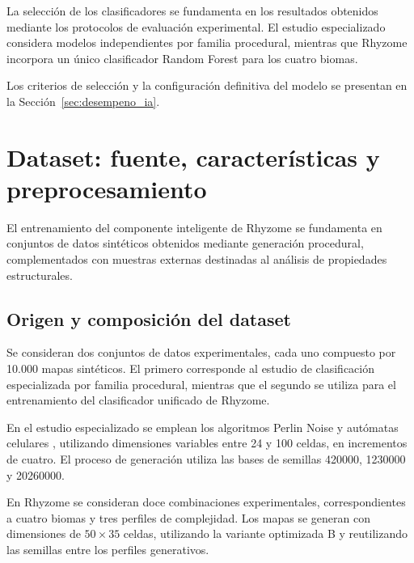 \FloatBarrier

La selección de los clasificadores se fundamenta en los resultados obtenidos mediante los protocolos de evaluación experimental. El estudio especializado considera modelos independientes por familia procedural, mientras que Rhyzome incorpora un único clasificador Random Forest para los cuatro biomas.

Los criterios de selección y la configuración definitiva del modelo se presentan en la Sección~\ref{sec:desempeno_ia}.


\section{Dataset: fuente, características y preprocesamiento}
\label{sec:dataset_ia}

El entrenamiento del componente inteligente de Rhyzome  se fundamenta en conjuntos de datos sintéticos obtenidos mediante generación procedural, complementados con muestras externas destinadas al análisis de propiedades estructurales.


\subsection{Origen y composición del dataset}
\label{subsec:origen_dataset}
\label{subsec:distribucion_dataset}

Se consideran dos conjuntos de datos experimentales, cada uno compuesto por 10.000 mapas sintéticos. El primero corresponde al estudio de clasificación especializada por familia procedural, mientras que el segundo se utiliza para el entrenamiento del clasificador unificado de Rhyzome.

En el estudio especializado se emplean los algoritmos Perlin Noise \parencite{perlin1985} y autómatas celulares \parencite{johnson2010}, utilizando dimensiones variables entre 24 y 100 celdas, en incrementos de cuatro. El proceso de generación utiliza las bases de semillas 420000, 1230000 y 20260000.

En Rhyzome se consideran doce combinaciones experimentales, correspondientes a cuatro biomas y tres perfiles de complejidad. Los mapas se generan con dimensiones de $50 \times 35$ celdas, utilizando la variante optimizada B y reutilizando las semillas entre los perfiles generativos.

